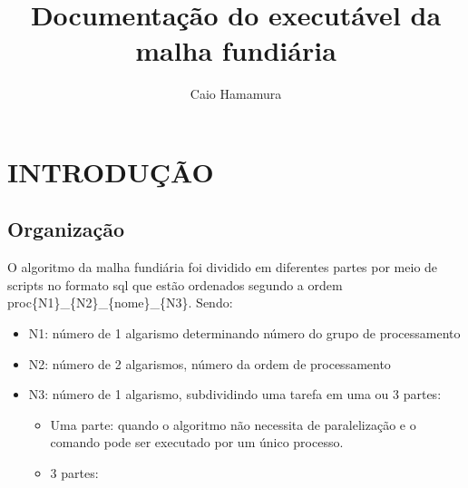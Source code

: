 \documentclass{book}
\title{\bfseries {
    Documentação do executável da malha fundiária
}}
\author{Caio Hamamura}
\begin{document}
\maketitle
\thispagestyle{empty}
\clearpage

\chapter{INTRODUÇÃO}

\section{Organização}
O algoritmo da malha fundiária foi dividido em diferentes partes por meio de scripts no formato sql que estão ordenados segundo a ordem proc\{N1\}\_\{N2\}\_\{nome\}\_\{N3\}. Sendo: 
\begin{itemize}
    \item N1: número de 1 algarismo determinando número do grupo de processamento
    \item N2: número de 2 algarismos, número da ordem de processamento
    \item N3: número de 1 algarismo, subdividindo uma tarefa em uma ou 3 partes: \begin{itemize}
        \item Uma parte: quando o algoritmo não necessita de paralelização e o comando pode ser executado por um único processo.
        \item 3 partes: 
        
    \end{itemize}
\end{itemize}
\end{document}
